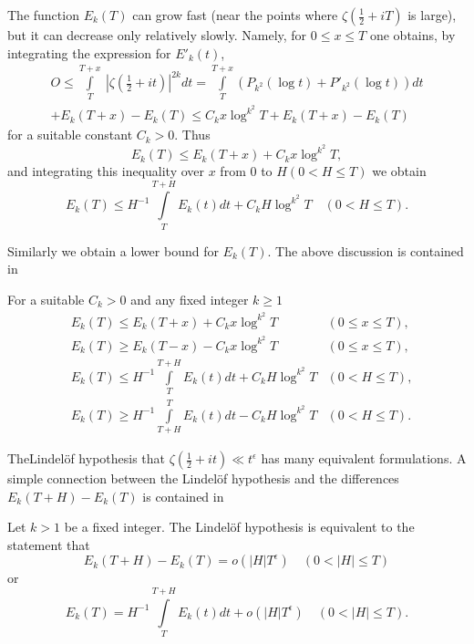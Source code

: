 The function $E_k(T)$ can grow fast (near the points where $\zeta
\left(\frac{1}{2}+ iT \right)$ is large), but it can decrease only
relatively slowly. Namely, for $0 \leq x \leq T$ one obtains, by
integrating the expression for $E'_k (t)$,
\begin{multline*}
  O \leq \int\limits_T^{T + x} ~\left|\zeta\left(\frac{1}{2} + it
  \right)\right|^{2k} dt = \int\limits_T^{T+x} \left(P_{k^2} (\log t) +
  P'_{k^2} (\log t)\right)dt\\
  + E_k (T + x)- E_k (T) \leq C_k x \log ^{k^2}T + E_k (T+x) - E_k (T)
\end{multline*}
for a suitable constant $C_k > 0$. Thus
$$
E_k (T) \leq E_k (T+ x) + C_k x \log^{k^2}T, 
$$
and integrating this inequality over $x$ from $0$ to $H(0 < H \leq T)$
we obtain 
$$
E_k (T) \leq H^{-1} \int\limits_T^{T+H} E_k (t) dt + C_k H \log^{k^2}T
\quad (0 < H \leq T).
$$

Similarly we obtain a lower bound for $E_k (T)$. The above discussion
is contained in 

\begin{lemma}\label{c4:lem4.2}
  For a suitable $C_k > 0$ and any fixed integer $k \geq 1$
  \begin{eqnarray}
    & E_k (T) \leq E_k (T+ x)+ C_k x \log ^{k^2} T &  (0 \leq x
    \leq T),\label{c4:eq4.15}\\
    & E_k (T)  \geq E_k (T-x) - C_k x \log ^{k^2} T &  (0 \leq x
    \leq T),\label{c4:eq4.16}\\
    & E_k (T)  \leq H^{-1}  \int\limits_T^{T+H} E_k (t) dt + C_k H
    \log ^{k^2} T &  (0 < H \leq T),\label{c4:eq4.17}\\
    & E_k (T)  \geq H^{-1}  \int\limits^T_{T+H} E_k (t) dt -C_k H
    \log ^{k^2} T & (0 < H \leq T).\label{c4:eq4.18}
  \end{eqnarray}
\end{lemma}

The\pageoriginale Lindel\"of hypothesis that $\zeta \left(\frac{1}{2}
+ it \right) \ll t^\epsilon$ has many equivalent formulations. A
simple connection between the Lindel\"of hypothesis and the
differences $E_k (T + H)- E_k (T)$ is contained in 

\begin{thm}\label{c4:thm4.1} 
  Let $k > 1$ be a fixed integer. The Lindel\"of hypothesis is
  equivalent to the statement that
\begin{equation}
E_k (T+H) - E_k (T)  = o  (|H|T^\epsilon) \quad (0 < |H|\leq
 T)\label{c4:eq4.19} 
\end{equation}
or
\begin{equation}
E_k(T)  = H^{-1} \int\limits_T^{T+H} E_k (t) dt + o(|H|
    T^\epsilon) \quad (0 < |H|\leq T).\label{c4:eq4.20}
\end{equation}
\end{thm}

